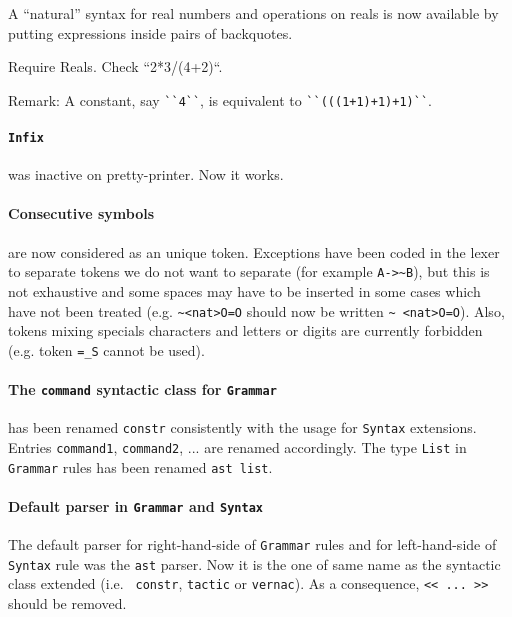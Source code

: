 \documentclass[11pt]{article}
\begin{document}
A ``natural'' syntax for real numbers and operations on reals is now
available by putting expressions inside pairs of backquotes.

\begin{coq_example}
Require Reals.
Check ``2*3/(4+2)``.
\end{coq_example}

Remark: A constant, say \verb:``4``:, is equivalent to
\verb:``(((1+1)+1)+1)``:.

\paragraph{{\tt Infix}} was inactive on pretty-printer. Now it works.

\paragraph{Consecutive symbols} are now considered as an unique token.
Exceptions have been coded in the lexer to separate tokens we do not want to
separate (for example \verb:A->~B:), but this is not exhaustive and some spaces
may have to be inserted in some cases which have not been treated
(e.g. \verb:~<nat>O=O: should now be written \verb:~ <nat>O=O:).
Also, tokens mixing specials characters and letters or digits
are currently forbidden (e.g. token \verb:=_S: cannot be used).


\paragraph{The {\tt command} syntactic class for {\tt Grammar}} has
been renamed {\tt constr} consistently with the usage for {\tt Syntax}
extensions. Entries {\tt command1}, {\tt command2}, ... are renamed
accordingly. The type {\tt List} in {\tt Grammar} rules has been
renamed {\tt ast list}.

\paragraph{Default parser in {\tt Grammar} and {\tt Syntax}}
\label{GrammarSyntax}

The default parser for right-hand-side of {\tt Grammar} rules and for
left-hand-side of {\tt Syntax} rule was the {\tt ast} parser.  Now it
is the one of same name as the syntactic class extended (i.e. {\tt
constr}, {\tt tactic} or {\tt vernac}). As a consequence, 
{\verb:<< ... >>:} should be removed.
\end{document}
